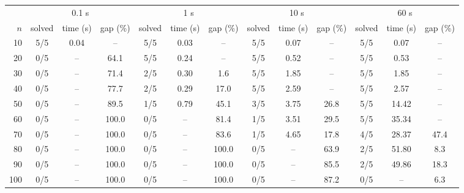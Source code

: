\begin{tabular}{rcccccccccccc}
\toprule
& \multicolumn{3}{c}{0.1 s} & \multicolumn{3}{c}{1 s} & \multicolumn{3}{c}{10 s} & \multicolumn{3}{c}{60 s} \\
\cmidrule(lr){2-4} \cmidrule(lr){5-7} \cmidrule(lr){8-10} \cmidrule(lr){11-13}
$n$ & solved & time (s) & gap (\%)& solved & time (s) & gap (\%)& solved & time (s) & gap (\%)& solved & time (s) & gap (\%) \\
\midrule
10 & 5/5 & 0.04 & -- & 5/5 & 0.03 & -- & 5/5 & 0.07 & -- & 5/5 & 0.07 & -- \\
20 & 0/5 & -- & 64.1 & 5/5 & 0.24 & -- & 5/5 & 0.52 & -- & 5/5 & 0.53 & -- \\
30 & 0/5 & -- & 71.4 & 2/5 & 0.30 & 1.6 & 5/5 & 1.85 & -- & 5/5 & 1.85 & -- \\
40 & 0/5 & -- & 77.7 & 2/5 & 0.29 & 17.0 & 5/5 & 2.59 & -- & 5/5 & 2.57 & -- \\
50 & 0/5 & -- & 89.5 & 1/5 & 0.79 & 45.1 & 3/5 & 3.75 & 26.8 & 5/5 & 14.42 & -- \\
60 & 0/5 & -- & 100.0 & 0/5 & -- & 81.4 & 1/5 & 3.51 & 29.5 & 5/5 & 35.34 & -- \\
70 & 0/5 & -- & 100.0 & 0/5 & -- & 83.6 & 1/5 & 4.65 & 17.8 & 4/5 & 28.37 & 47.4 \\
80 & 0/5 & -- & 100.0 & 0/5 & -- & 100.0 & 0/5 & -- & 63.9 & 2/5 & 51.80 & 8.3 \\
90 & 0/5 & -- & 100.0 & 0/5 & -- & 100.0 & 0/5 & -- & 85.5 & 2/5 & 49.86 & 18.3 \\
100 & 0/5 & -- & 100.0 & 0/5 & -- & 100.0 & 0/5 & -- & 87.2 & 0/5 & -- & 6.3 \\
\bottomrule
\end{tabular}
